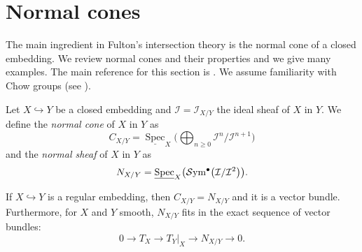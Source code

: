 \documentclass[pdftex]{sigma}
\numberwithin{equation}{section}
\theoremstyle{plain}
\theoremstyle{definition}
\theoremstyle{remark}
\begin{document}
\section{Normal cones}\label{normalcones}

The main ingredient in Fulton's intersection theory is the normal cone of a closed embedding. We review normal cones and their properties and we give many examples. The main reference for this section is \cite[Chapters~4 and~5]{Fulton}. We assume familiarity with Chow groups (see \cite[Chapters~1 and~2]{Fulton}).

\begin{Definition}
Let $X\hookrightarrow Y$ be a closed embedding and $\mathcal I=\mathcal{I}_{X/Y}$ the ideal sheaf of $X$ in $Y$. We define the
\emph{normal cone} of $X$ in $Y$ as
\[C_{X/Y}=\underline{\operatorname{Spec}}_X\bigg(\bigoplus_{n\geq 0}\mathcal{I}^n/\mathcal{I}^{n+1}\bigg)\]
and the \emph{normal sheaf} of $X$ in $Y$ as
\[N_{X/Y}=\underline{\operatorname{Spec}}_X\big({\mathcal S}{\rm ym}^\bullet \big(\mathcal{I}/\mathcal{I}^2\big)\big).\]
\end{Definition}

\begin{Example}
If $X\hookrightarrow Y$ is a regular embedding, then $C_{X/Y}=N_{X/Y}$ and it is a vector bundle. Furthermore, for $X$ and $Y$ smooth, $N_{X/Y}$ fits in the exact sequence of vector bundles:
\[0\to T_X\to T_{Y}\rvert_X\to N_{X/Y}\to 0.\]
\end{Example}
\end{document}
